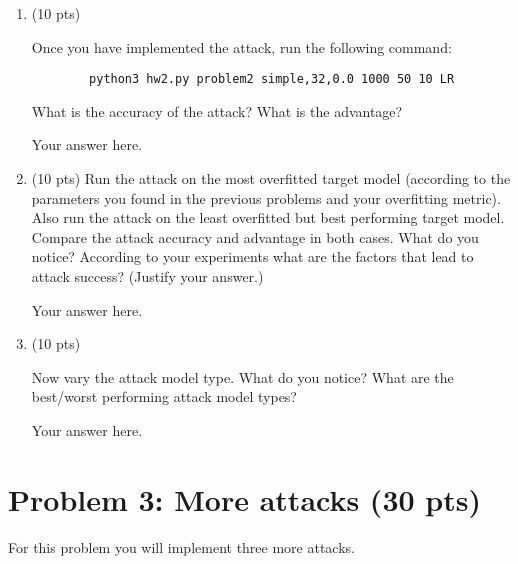 %
\begin{enumerate}
%
	\item (10 pts) 

	Once you have implemented the attack, run the following command:
	\begin{Verbatim}
		python3 hw2.py problem2 simple,32,0.0 1000 50 10 LR
	\end{Verbatim}	
	
	What is the accuracy of the attack? What is the advantage?
	
	\begin{answer}
	
		Your answer here.
		
	\end{answer}
	
	\item (10 pts) Run the attack on the most overfitted target model (according to the parameters you found in the previous problems and your overfitting metric). Also run the attack on the least overfitted but best performing  target model. Compare the attack accuracy and advantage in both cases. What do you notice? According to your experiments what are the factors that lead to attack success? (Justify your answer.)
	
	
	\begin{answer}
	
		Your answer here.
		
	\end{answer}
	
	\item (10 pts) 

	Now vary the attack model type. What do you notice? What are the best/worst performing attack model types?
	
	\begin{answer}
	
		Your answer here.
		
	\end{answer}
%
\end{enumerate}


\newpage
\section*{Problem 3: More attacks (30 pts)}
%

For this problem you will implement three more attacks.

